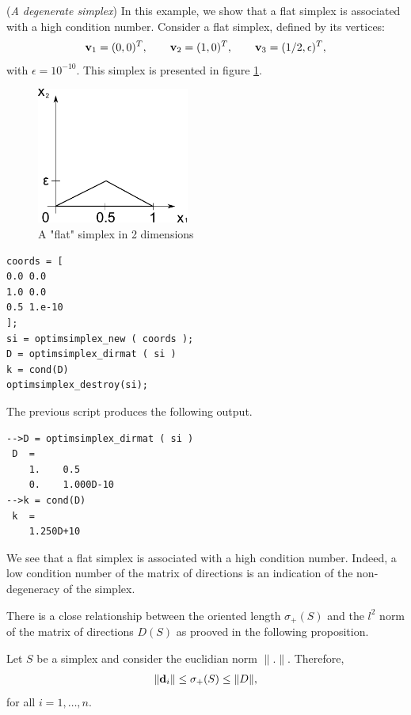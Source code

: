 \begin{example}
(\emph{A degenerate simplex})
In this example, we show that a flat simplex is associated 
with a high condition number.
Consider a flat simplex, defined by its vertices:
\begin{eqnarray}
\mathbf{v}_1=(0,0)^T, \qquad \mathbf{v}_2=(1,0)^T, \qquad \mathbf{v}_3=(1/2,\epsilon)^T,
\end{eqnarray}
with $\epsilon = 10^{-10}$. This simplex is presented in figure \ref{fig-simplex-flat}.

\begin{figure}
\begin{center}
\includegraphics[width=5cm]{simplextheory/simplex_flat.pdf}
\end{center}
\caption{A "flat" simplex in 2 dimensions}
\label{fig-simplex-flat}
\end{figure}

\lstset{language=scilabscript}
\begin{lstlisting}
coords = [
0.0 0.0
1.0 0.0
0.5 1.e-10
];
si = optimsimplex_new ( coords );
D = optimsimplex_dirmat ( si )
k = cond(D)
optimsimplex_destroy(si);
\end{lstlisting}
The previous script produces the following output.
\lstset{language=scilabscript}
\begin{lstlisting}
-->D = optimsimplex_dirmat ( si )
 D  =
    1.    0.5        
    0.    1.000D-10  
-->k = cond(D)
 k  =
    1.250D+10  
\end{lstlisting}
We see that a flat simplex is associated with a high 
condition number. Indeed, a low condition number of the matrix of 
directions is an indication of the non-degeneracy of the simplex.
\end{example}

There is a close relationship between the oriented length
$\sigma_+(S)$ and the $l^2$ norm of the matrix of directions 
$D(S)$ as prooved in the following proposition.

\begin{proposition}
\label{prop-simplex-inequalitysigmaplus}
Let $S$ be a simplex and consider the euclidian norm $\|.\|$.
Therefore,
\begin{eqnarray}
\label{eq-simplex-inequalitysigmaplus}
\|\mathbf{d}_i\| \leq \sigma_+(S) \leq \|D\|,
\end{eqnarray}
for all $i=1,\ldots,n$.
\end{proposition}

